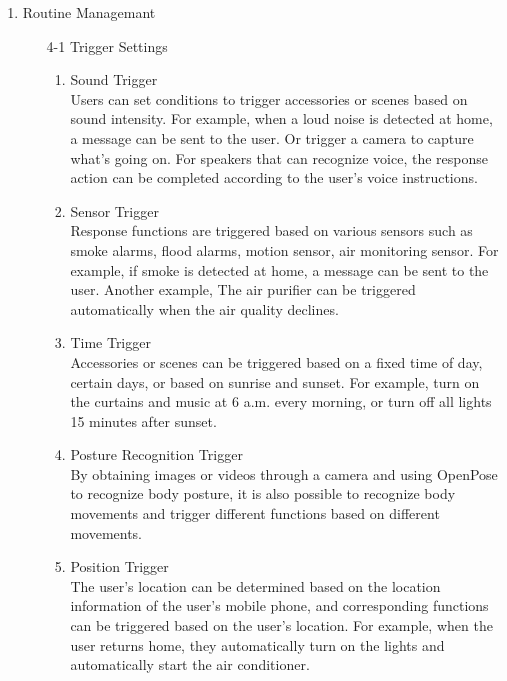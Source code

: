 \documentclass[11pt, conference]{IEEEtran}
\begin{document}
\begin{enumerate}[label=\arabic*]
    \item {\large{Routine Managemant}}
    \begin{enumerate}[label=\alph*]
        \item [4-1]{\large{Trigger Settings}}
            \begin{enumerate}
              \item {\large{Sound Trigger}}\\
              Users can set conditions to trigger accessories or scenes based on sound intensity. For example, when a loud noise is detected at home, a message can be sent to the user. Or trigger a camera to capture what's going on. For speakers that can recognize voice, the response action can be completed according to the user's voice instructions.\\
              \item {\large{Sensor Trigger}}\\
              Response functions are triggered based on various sensors such as smoke alarms, flood alarms, motion sensor, air monitoring sensor. For example, if smoke is detected at home, a message can be sent to the user. Another example, The air purifier can be triggered automatically when the air quality declines.\\
              \item {\large{Time Trigger}}\\
              Accessories or scenes can be triggered based on a fixed time of day, certain days, or based on sunrise and sunset. For example, turn on the curtains and music at 6 a.m. every morning, or turn off all lights 15 minutes after sunset.\\
              \item {\large{Posture Recognition Trigger}}\\
              By obtaining images or videos through a camera and using OpenPose to recognize body posture, it is also possible to recognize body movements and trigger different functions based on different movements.\\
              \item {\large{Position Trigger}}\\
              The user's location can be determined based on the location information of the user's mobile phone, and corresponding functions can be triggered based on the user's location. For example, when the user returns home, they automatically turn on the lights and automatically start the air conditioner.\\
            \end{enumerate}
    

\end{enumerate}
\end{enumerate}
\end{document}

